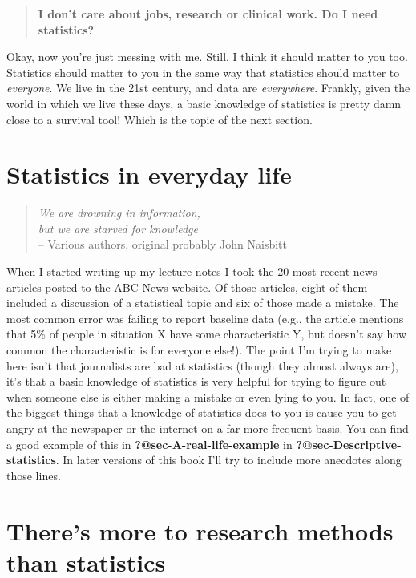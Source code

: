 \documentclass[
  a4paper,
]{book}
\begin{document}
\begin{quote}
\textbf{I don't care about jobs, research or clinical work. Do I need
statistics?}
\end{quote}

Okay, now you're just messing with me. Still, I think it should matter
to you too. Statistics should matter to you in the same way that
statistics should matter to \emph{everyone}. We live in the 21st
century, and data are \emph{everywhere}. Frankly, given the world in
which we live these days, a basic knowledge of statistics is pretty damn
close to a survival tool! Which is the topic of the next section.

\hypertarget{statistics-in-everyday-life}{%
\section{Statistics in everyday
life}\label{statistics-in-everyday-life}}

\begin{quote}
\emph{We are drowning in information,}\\
\emph{but we are starved for knowledge}\\
-- Various authors, original probably John Naisbitt
\end{quote}

When I started writing up my lecture notes I took the 20 most recent
news articles posted to the ABC News website. Of those articles, eight
of them included a discussion of a statistical topic and six of those
made a mistake. The most common error was failing to report baseline
data (e.g., the article mentions that 5\% of people in situation X have
some characteristic Y, but doesn't say how common the characteristic is
for everyone else!). The point I'm trying to make here isn't that
journalists are bad at statistics (though they almost always are), it's
that a basic knowledge of statistics is very helpful for trying to
figure out when someone else is either making a mistake or even lying to
you. In fact, one of the biggest things that a knowledge of statistics
does to you is cause you to get angry at the newspaper or the internet
on a far more frequent basis. You can find a good example of this in
\textbf{?@sec-A-real-life-example} in
\textbf{?@sec-Descriptive-statistics}. In later versions of this book
I'll try to include more anecdotes along those lines.

\hypertarget{theres-more-to-research-methods-than-statistics}{%
\section{There's more to research methods than
statistics}\label{theres-more-to-research-methods-than-statistics}}
\end{document}
